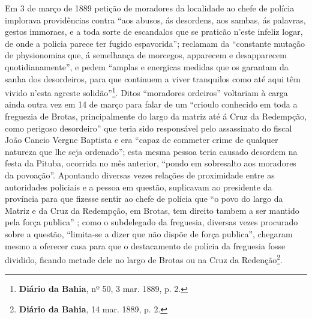 Em 3 de março de 1889 petição de moradores da localidade ao chefe de polícia implorava providências contra ``aos abusos, ás desordens, aos sambas, ás palavras, gestos immoraes, e a toda sorte de escandalos que se praticão n'este infeliz logar, de onde a policia parece ter fugido espavorida''; reclamam da ``constante mutação de physionomias que, á semelhança de morcegos, apparecem e desapparecem quotidianamente'', e pedem ``amplas e energicas medidas que os garantam da sanha dos desordeiros, para que continuem a viver tranquilos como até aqui têm vivido n'esta agreste solidão''\footnote{\textbf{Diário da Bahia}, nº 50, 3 mar. 1889, p. 2.}. Ditos ``moradores ordeiros'' voltariam à carga ainda outra vez em 14 de março para falar de um ``crioulo conhecido em toda a freguezia de Brotas, principalmente do largo da matriz até á Cruz da Redempção, como perigoso desordeiro'' que teria sido responsável pelo assassinato do fiscal João Cancio Vergne Baptista e era ``capaz de commeter crime de qualquer natureza que lhe seja ordenado''; esta mesma pessoa teria causado desordem na festa da Pituba, ocorrida no mês anterior, ``pondo em sobresalto aos moradores da povoação''. Apontando diversas vezes relações de proximidade entre as autoridades policiais e a pessoa em questão, suplicavam ao presidente da província para que fizesse sentir ao chefe de polícia que ``o povo do largo da Matriz e da Cruz da Redempção, em Brotas, tem direito tambem a ser mantido pela força publica'' ; como o subdelegado da freguesia, diversas vezes procurado sobre a questão, ``limita-se a dizer que não dispõe de força publica'', chegaram mesmo a oferecer casa para que o destacamento de polícia da freguesia fosse dividido, ficando metade dele no largo de Brotas ou na Cruz da Redenção\footnote{\textbf{Diário da Bahia}, 14 mar. 1889, p. 2.}.
